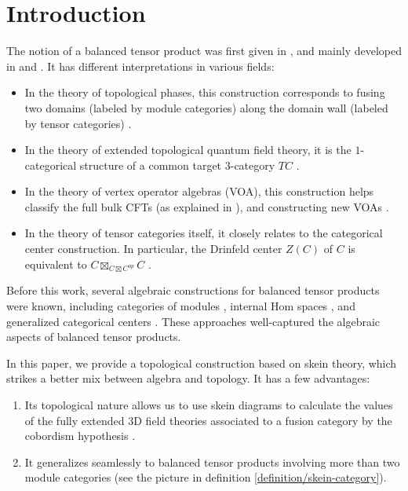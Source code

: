\section{Introduction}

The notion of a balanced tensor product was first given in
\cite{etingof/fusion-cat-and-homotopy}, and mainly developed in
\cite{douglas/balanced-product} and \cite{douglas/dualizable-tensor-categories}.
It has different interpretations in various fields:
\begin{itemize}
  \item In the theory of topological phases, this construction corresponds to
        fusing two domains (labeled by module categories) along the domain
        wall (labeled by tensor categories) \cite{kong/topological-order}.
  \item In the theory of extended topological quantum field theory, it is the
        $1$-categorical structure of a common target $3$-category $TC$
        \cite{douglas/dualizable-tensor-categories}.
  \item In the theory of vertex operator algebras (VOA), this construction helps
        classify the full bulk CFTs (as explained in
        \cite{gannon/exotic-quantum-subgroup}), and constructing new VOAs
        \cite{gannon/sln-II}.
  \item In the theory of tensor categories itself, it closely relates to the
        categorical center construction. In particular, the Drinfeld center
        $Z(C)$ of $C$ is equivalent to $C \boxtimes_{C \boxtimes C^{op}} C$
        \cite{kirillov/string-net-tv}
        \cite{douglas/dualizable-tensor-categories}.
\end{itemize}

Before this work, several algebraic constructions for balanced tensor products
were known, including categories of modules \cite{douglas/balanced-product},
internal Hom spaces \cite{davydov/picard}, and generalized categorical centers
\cite{etingof/fusion-cat-and-homotopy} \cite{kirillov/fact-homo-4d-tqft}
\cite{hoek/master}. These approaches well-captured the algebraic aspects of
balanced tensor products.

In this paper, we provide a topological construction based on skein theory,
which strikes a better mix between algebra and topology. It has a few advantages:

\begin{enumerate}
  \item Its topological nature allows us to use skein diagrams to calculate the
        values of the fully extended $3$D field theories associated to a
        fusion category by the cobordism hypothesis \cite{lurie/tqft}
        \cite{douglas/dualizable-tensor-categories}
        \cite{guu/tv-as-3-functor}.
  \item It generalizes seamlessly to balanced tensor products involving more than
        two module categories (see the picture in definition
        \ref{definition/skein-category}).
      \end{enumerate}


